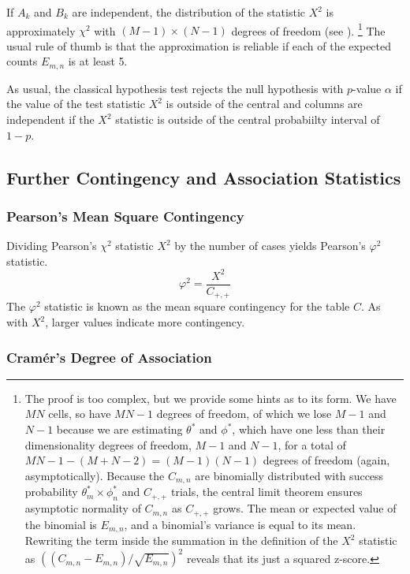 If $A_k$ and $B_k$ are independent, the distribution of the statistic
$X^2$ is approximately $\chi^2$ with $(M-1) \times (N-1)$ degrees of
freedom (see ).%
%
\footnote{The proof is too complex, but we provide some hints as to
  its form.  We have $MN$ cells, so have $MN-1$ degrees of freedom, of
  which we lose $M-1$ and $N-1$ because we are estimating $\theta^*$
  and $\phi^*$, which have one less than their dimensionality degrees
  of freedom, $M-1$ and $N-1$, for a total of $MN-1 - (M + N -2) =
  (M-1)(N-1)$ degrees of freedom (again, asymptotically).  Because the
  $C_{m,n}$ are binomially distributed with success probability
  $\theta^*_m \times \phi^*_n$ and $C_{+,+}$ trials, the central limit
  theorem ensures asymptotic normality of $C_{m,n}$ as $C_{+,+}$
  grows.  The mean or expected value of the binomial is $E_{m,n}$, and
  a binomial's variance is equal to its mean.  Rewriting the term
  inside the summation in the definition of the $X^2$ statistic as
  $((C_{m,n} - E_{m,n})/\sqrt{E_{m,n}})^2$ reveals that its just a
  squared z-score.}
%
The usual rule of thumb is that the approximation is reliable if each
of the expected counts $E_{m,n}$ is at least 5.

As usual, the classical hypothesis test rejects the null hypothesis with
$p$-value $\alpha$ if the value of the test statistic $X^2$ is outside
of the central and columns are independent if the $X^2$ statistic is
outside of the central probabiilty interval of $1-p$.

\subsection{Further Contingency and Association Statistics}

\subsubsection{Pearson's Mean Square Contingency}
Dividing Pearson's $\chi^2$ statistic $X^2$ by the number of cases
yields Pearson's $\varphi^2$ statistic.
%
\begin{equation}
\varphi^2 =\frac{X^2}{C_{+,+}}
\end{equation}
%
The $\varphi^2$ statistic is known as the mean square contingency for
the table $C$.  As with $X^2$, larger values indicate more contingency.

\subsubsection{Cramér's Degree of Association}

